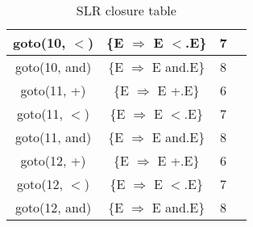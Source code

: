 \begin{table}[!ht]
\begin{minipage}[t]{.4\linewidth}
\begin{tabular}{|c|c|c|c|}
      \hline
      goto(10, $<$)	& \{E $\Rightarrow$ E $<$.E\} & 7 & \\
      \hline
      goto(10, and)	& \{E $\Rightarrow$ E and.E\} & 8 & \\
      \hline
      goto(11, +)	& \{E $\Rightarrow$ E +.E\} & 6 & \\
      \hline
      goto(11, $<$)	& \{E $\Rightarrow$ E $<$.E\} & 7 & \\
      \hline
      goto(11, and)	& \{E $\Rightarrow$ E and.E\} & 8 & \\
      \hline
      goto(12, +)	& \{E $\Rightarrow$ E +.E\} & 6 & \\
      \hline
      goto(12, $<$)	& \{E $\Rightarrow$ E $<$.E\} & 7 & \\
      \hline
      goto(12, and)	& \{E $\Rightarrow$ E and.E\} & 8 & \\
      \hline
    \end{tabular}
  \end{minipage}
  \caption{SLR closure table}
\end{table}
